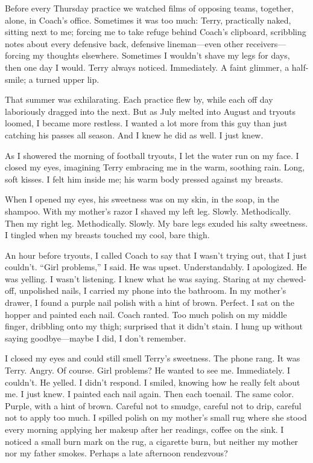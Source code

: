 Before every Thursday practice we watched films of opposing teams,
together, alone, in Coach's office. Sometimes it was too much: Terry,
practically naked, sitting next to me; forcing me to take refuge behind
Coach's clipboard, scribbling notes about every defensive back,
defensive lineman---even other receivers---forcing my thoughts
elsewhere. Sometimes I wouldn't shave my legs for days, then one day I
would. Terry always noticed. Immediately. A faint glimmer, a half-smile;
a turned upper lip.

That summer was exhilarating. Each practice flew by, while each off day
laboriously dragged into the next. But as July melted into August and
tryouts loomed, I became more restless. I wanted a lot more from this
guy than just catching his passes all season. And I knew he did as well.
I just knew.

As I showered the morning of football tryouts, I let the water run on my
face. I closed my eyes, imagining Terry embracing me in the warm,
soothing rain. Long, soft kisses. I felt him inside me; his warm body
pressed against my breasts.

When I opened my eyes, his sweetness was on my skin, in the soap, in the
shampoo. With my mother's razor I shaved my left leg. Slowly.
Methodically. Then my right leg. Methodically. Slowly. My bare legs
exuded his salty sweetness. I tingled when my breasts touched my cool,
bare thigh.

An hour before tryouts, I called Coach to say that I wasn't trying out,
that I just couldn't. ``Girl problems,'' I said. He was upset.
Understandably. I apologized. He was yelling. I wasn't listening. I knew
what he was saying. Staring at my chewed-off, unpolished nails, I
carried my phone into the bathroom. In my mother's drawer, I found a
purple nail polish with a hint of brown. Perfect. I sat on the hopper
and painted each nail. Coach ranted. Too much polish on my middle
finger, dribbling onto my thigh; surprised that it didn't stain. I hung
up without saying goodbye---maybe I did, I don't remember.

I closed my eyes and could still smell Terry's sweetness. The phone
rang. It was Terry. Angry. Of course. Girl problems? He wanted to see
me. Immediately. I couldn't. He yelled. I didn't respond. I smiled,
knowing how he really felt about me. I just knew. I painted each nail
again. Then each toenail. The same color. Purple, with a hint of brown.
Careful not to smudge, careful not to drip, careful not to apply too
much. I spilled polish on my mother's small rug where she stood every
morning applying her makeup after her readings, coffee on the sink. I
noticed a small burn mark on the rug, a cigarette burn, but neither my
mother nor my father smokes. Perhaps a late afternoon rendezvous?

